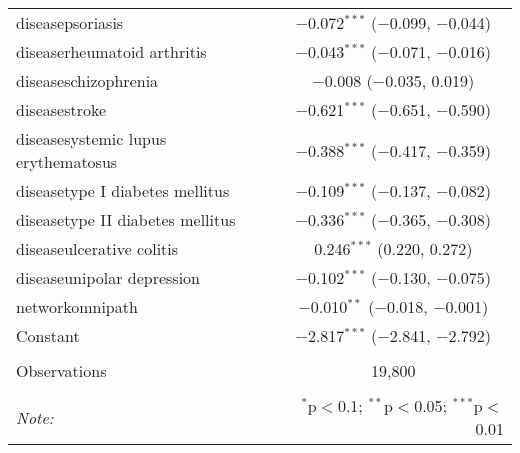\begin{table}[!htbp]
\begin{tabular}{@{\extracolsep{5pt}}lc}
  diseasepsoriasis & $-$0.072$^{***}$ ($-$0.099, $-$0.044) \\ 
  diseaserheumatoid arthritis & $-$0.043$^{***}$ ($-$0.071, $-$0.016) \\ 
  diseaseschizophrenia & $-$0.008 ($-$0.035, 0.019) \\ 
  diseasestroke & $-$0.621$^{***}$ ($-$0.651, $-$0.590) \\ 
  diseasesystemic lupus erythematosus & $-$0.388$^{***}$ ($-$0.417, $-$0.359) \\ 
  diseasetype I diabetes mellitus & $-$0.109$^{***}$ ($-$0.137, $-$0.082) \\ 
  diseasetype II diabetes mellitus & $-$0.336$^{***}$ ($-$0.365, $-$0.308) \\ 
  diseaseulcerative colitis & 0.246$^{***}$ (0.220, 0.272) \\ 
  diseaseunipolar depression & $-$0.102$^{***}$ ($-$0.130, $-$0.075) \\ 
  networkomnipath & $-$0.010$^{**}$ ($-$0.018, $-$0.001) \\ 
  Constant & $-$2.817$^{***}$ ($-$2.841, $-$2.792) \\ 
 \hline \\[-1.8ex] 
Observations & 19,800 \\ 
\hline 
\hline \\[-1.8ex] 
\textit{Note:}  & \multicolumn{1}{r}{$^{*}$p$<$0.1; $^{**}$p$<$0.05; $^{***}$p$<$0.01} \\ 
\end{tabular} 
\end{table} 
